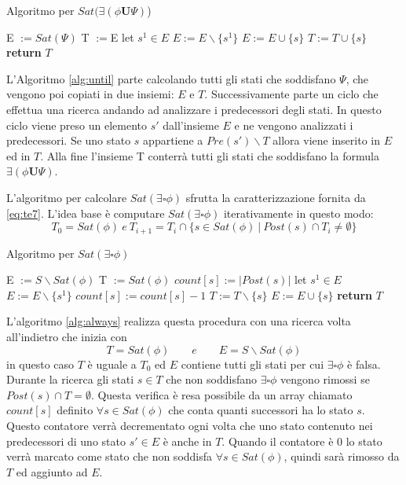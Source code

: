 \documentclass[a4paper, 10pt]{article}
\numberwithin{equation}{theor}
\begin{document}
\begin{algorithm}
\caption{Algoritmo per $Sat(\exists(\phi \boldsymbol{U} \Psi)$)}
\label{alg:until}
\begin{algorithmic}[1]
\State E $:= Sat(\Psi)$
\State T $:=$E
\State let $s^{1} \in E$
\State $E:=E \backslash \{s^{1}\}$
\State $E:= E \cup \{s\}$
\State $T:=T \cup\{s\}$
\EndIf
\EndFor
\EndWhile
\State \textbf{return} $T$
\EndProcedure
\end{algorithmic}
\end{algorithm}
L'Algoritmo \ref{alg:until} parte calcolando tutti gli stati che soddisfano $\Psi$, che vengono poi copiati in due insiemi: $E$ e $T$. Successivamente parte un ciclo che effettua una ricerca andando ad analizzare i predecessori degli stati. In questo ciclo viene preso un elemento $s'$ dall'insieme $E$ e ne vengono analizzati i predecessori. Se uno stato $s$ appartiene a  $Pre(s') \backslash T$ allora viene inserito in $E$ ed in $T$. Alla fine l'insieme T conterrà tutti gli stati che soddisfano la formula  $\exists(\phi \boldsymbol{U} \Psi)$.\par
L'algoritmo per calcolare $Sat(\exists \square \phi)$ sfrutta la caratterizzazione fornita da \ref{eq:te7}. L'idea base è computare $Sat(\exists \square \phi)$ iterativamente in questo modo:
$$T_{0} = Sat(\phi)\ e \ T_{i+1} = T_{i} \cap \{s \in Sat(\phi)\  |\ Post(s) \cap T_{i} \neq \emptyset\}$$
\begin{algorithm}
\caption{Algoritmo per $Sat(\exists \square \phi)$}
\label{alg:always}
\begin{algorithmic}[1]
\State E $:= S \backslash Sat(\phi)$
\State T $:=Sat(\phi)$
\State $count[s] := |Post(s)|$
\EndFor
{}
\State let $s^{1} \in E$
\State $E:=E \backslash \{s^{1}\}$
\State $count[s] := count[s]-1$
\State $T := T \backslash \{s\}$
\State $E := E \cup \{s\}$
\EndIf
\EndIf
\EndFor
\EndWhile
\State \textbf{return} $T$
\EndProcedure
\end{algorithmic}
\end{algorithm}
L'algoritmo \ref{alg:always} realizza questa procedura con una ricerca volta all'indietro che inizia con
$$T = Sat(\phi) \qquad e \qquad E = S\backslash Sat(\phi)$$
in questo caso $T$ è uguale a $T_{0}$ ed $E$ contiene tutti gli stati per cui $\exists \square \phi$ è falsa. Durante la ricerca gli stati $s \in T$ che non soddisfano $\exists \square \phi$ vengono rimossi se $Post(s) \cap T = \emptyset$.
Questa verifica è resa possibile da un array chiamato
$count[s]$ definito $\forall s \in Sat(\phi)$ che conta quanti successori ha lo stato $s$. Questo contatore verrà decrementato ogni volta che uno stato contenuto nei predecessori di uno stato $s' \in E$ è anche in $T$. Quando il contatore è $0$ lo stato verrà marcato come stato che non soddisfa $\forall s \in Sat(\phi)$, quindi sarà rimosso da $T$ ed aggiunto ad $E$.
\end{document}
